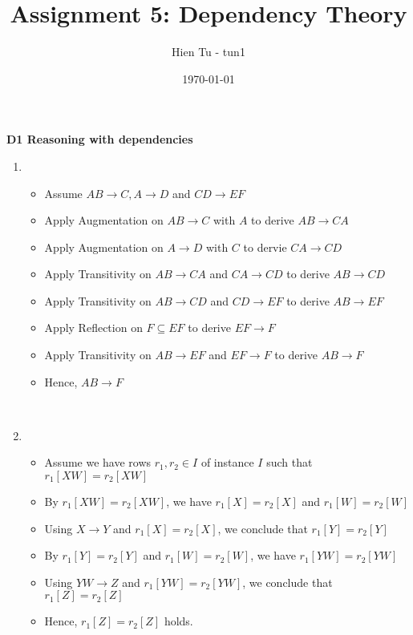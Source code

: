 \documentclass[12pt]{article}
\title{Assignment 5: Dependency Theory}
\author{Hien Tu - tun1}
\date{\today}
\begin{document}
\maketitle

\textbf{D1 Reasoning with dependencies}

\begin{enumerate}
  \item
    \begin{itemize}
      \item Assume $AB \longrightarrow C, A \longrightarrow D$ and $CD
            \longrightarrow EF$
      \item Apply Augmentation on $AB \longrightarrow C$ with $A$ to derive $AB
            \longrightarrow CA$
      \item Apply Augmentation on $A \longrightarrow D$ with $C$ to dervie $CA
            \longrightarrow CD$
      \item Apply Transitivity on $AB \longrightarrow CA$ and $CA
            \longrightarrow CD$ to derive $AB \longrightarrow CD$
      \item Apply Transitivity on $AB \longrightarrow CD$ and $CD
            \longrightarrow EF$ to derive $AB \longrightarrow EF$
      \item Apply Reflection on $F \subseteq EF$ to derive $EF \longrightarrow
            F$
      \item Apply Transitivity on $AB \longrightarrow EF$ and $EF
            \longrightarrow F$ to derive $AB \longrightarrow F$
      \item Hence, $AB \longrightarrow F$
    \end{itemize}
    \ \\

  \item
    \begin{itemize}
      \item Assume we have rows $r_1, r_2 \in I$ of instance $I$ such that
            $r_1[XW] = r_2[XW]$
      \item By $r_1[XW] = r_2[XW]$, we have $r_1[X] = r_2[X]$ and $r_1[W] =
            r_2[W]$
      \item Using $X \longrightarrow Y$ and $r_1[X] = r_2[X]$, we conclude that
            $r_1[Y] = r_2[Y]$
      \item By $r_1[Y] = r_2[Y]$ and $r_1[W] = r_2[W]$, we have $r_1[YW] =
            r_2[YW]$
      \item Using $YW \longrightarrow Z$ and $r_1[YW] = r_2[YW]$, we conclude
            that $r_1[Z] = r_2[Z]$
      \item Hence, $r_1[Z] = r_2[Z]$ holds.
    \end{itemize}
  \ \\


\end{enumerate}
\end{document}

